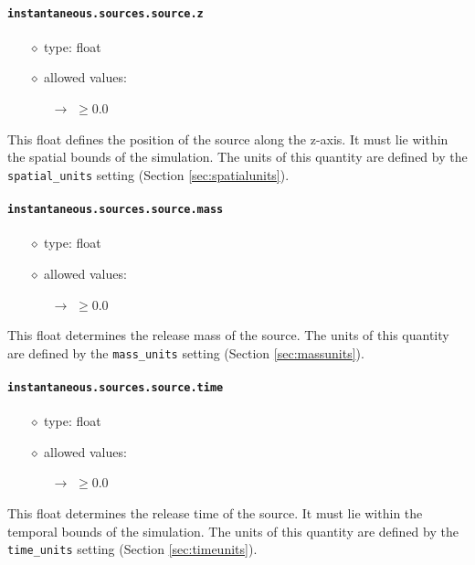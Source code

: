 \documentclass[]{article}
\def\code#1{\texttt{#1}}
\begin{document}
\paragraph{\code{instantaneous.sources.source.z}}\label{sec:instsourcez}
\begin{itemize}
    \item[$\diamond$] type: float 
    \item[$\diamond$] allowed values:
    \begin{itemize}
        \item[$\rightarrow$] $\geq0.0$
    \end{itemize}
\end{itemize}
This float defines the position of the source along the z-axis. It must lie
within the spatial bounds of the simulation. The units of this quantity are
defined by the \code{spatial\_units} setting (Section \ref{sec:spatialunits}).

\paragraph{\code{instantaneous.sources.source.mass}}\label{sec:instsourcemass}
\begin{itemize}
    \item[$\diamond$] type: float 
    \item[$\diamond$] allowed values:
    \begin{itemize}
        \item[$\rightarrow$] $\geq0.0$
    \end{itemize}
\end{itemize}
This float determines the release mass of the source. The units of this quantity
are defined by the \code{mass\_units} setting (Section
\ref{sec:massunits}).

\paragraph{\code{instantaneous.sources.source.time}}\label{sec:instsourcetime}
\begin{itemize}
    \item[$\diamond$] type: float 
    \item[$\diamond$] allowed values:
    \begin{itemize}
        \item[$\rightarrow$] $\geq0.0$
    \end{itemize}
\end{itemize}
This float determines the release time of the source. It must lie within the
temporal bounds of the simulation. The units of this quantity are defined by the
\code{time\_units} setting (Section \ref{sec:timeunits}).
\end{document}
